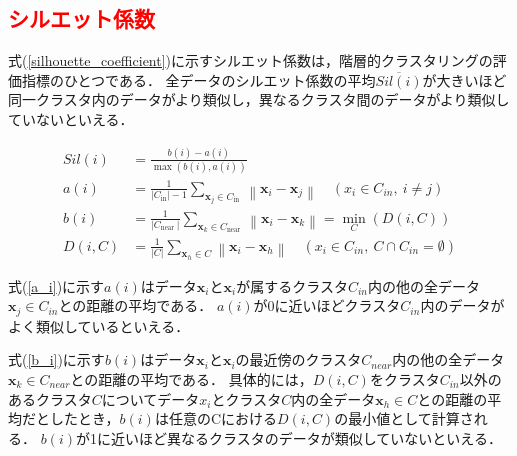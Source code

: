 \documentclass[12pt,a4j]{jreport}
\begin{document}





\subsection{\textcolor{red}{シルエット係数}}
式(\ref{silhouette_coefficient})に示すシルエット係数は，階層的クラスタリングの評価指標のひとつである\cite{aranganayagi_clustering_2007}．
全データのシルエット係数の平均$\overline{Sil(i)}$が大きいほど同一クラスタ内のデータがより類似し，異なるクラスタ間のデータがより類似していないといえる．

\begin{align}
  Sil(i) &= \frac{b(i) - a(i)}{\max ( b(i) , a(i))}
  \label{silhouette_coefficient}
  \\
  a(i)
  &=\frac{1}{\left|C_{\text {in}}\right|-1} \sum_{\boldsymbol{x}_{j} \in C_{\text {in }}}\left\|\boldsymbol{x}_{i}-\boldsymbol{x}_{j}\right\|
  \quad(x_i \in C_{in} ,~ i \neq j)
  \label{a_i}
  \\
  b(i)
  &=\frac{1}{\left|C_{\text {near }}\right|} \sum_{\boldsymbol{x}_{k} \in C_{\text {near }}}\left\|\boldsymbol{x}_{i}-\boldsymbol{x}_{k}\right\|
  = \min_C{\left( D(i, C) \right)}
  \label{b_i}
  \\
  D(i, C)
  &=\frac{1}{\left|C \right|} \sum_{\boldsymbol{x}_{h} \in C}\left\|\boldsymbol{x}_{i}-\boldsymbol{x}_{h}\right\|
  \quad (x_i \in C_{in},~ C \cap C_{in} = \emptyset)
  \label{d_ic}
\end{align}

式(\ref{a_i})に示す$a(i)$はデータ$\bm{x}_i$と$\bm{x}_i$が属するクラスタ$C_{in}$内の他の全データ$\bm{x}_j \in C_{in}$との距離の平均である．
$a(i)$が0に近いほどクラスタ$C_{in}$内のデータがよく類似しているといえる．

式(\ref{b_i})に示す$b(i)$はデータ$\bm{x}_i$と$\bm{x}_i$の最近傍のクラスタ$C_{near}$内の他の全データ$\bm{x}_k \in C_{near}$との距離の平均である．
具体的には，$D(i, C)$をクラスタ$C_{in}$以外のあるクラスタ$C$についてデータ$x_i$とクラスタ$C$内の全データ$\bm{x}_h \in C$との距離の平均だとしたとき，$b(i)$は任意のCにおける$D(i, C)$の最小値として計算される．
$b(i)$が1に近いほど異なるクラスタのデータが類似していないといえる．
\end{document}
